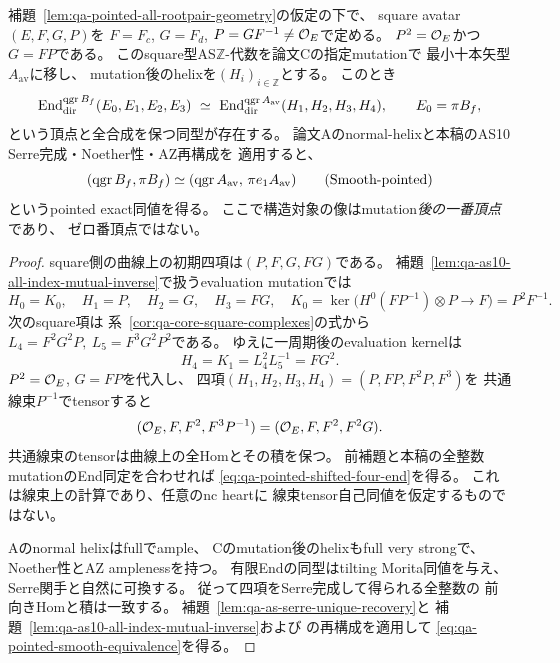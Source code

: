 \begin{theorem}[全noncubic幾何点の位相を合わせたpointed認識]
\label{thm:qa-point-smooth-noncubic-pointed}
\label{thm:qa-point-all-noncubic-pointed}
\label{prop:qa-point-mcm-pointed-finite-end-reduction}
補題~\ref{lem:qa-pointed-all-rootpair-geometry}の仮定の下で、
square avatar $(E,F,G,P)$を
$F=F_c$, $G=F_d$, $P=GF^{-1}\ne\mathcal O_E$で定める。
$P^2=\mathcal O_E$かつ$G=FP$である。
このsquare型AS$\mathbb Z$-代数を論文Cの指定mutationで
最小十本矢型$A_{\mathrm{av}}$に移し、
mutation後のhelixを$(H_i)_{i\in\mathbb Z}$とする。
このとき
\begin{equation}
 \operatorname{End}_{\mathrm{dir}}^{\operatorname{qgr} B_f}(E_0,E_1,E_2,E_3)
 \ \simeq\
 \operatorname{End}_{\mathrm{dir}}^{\operatorname{qgr} A_{\mathrm{av}}}(H_1,H_2,H_3,H_4),
\qquad E_0=\pi B_f,
\label{eq:qa-pointed-shifted-four-end}
\end{equation}
という頂点と全合成を保つ同型が存在する。
論文Aのnormal-helixと本稿のAS10 Serre完成・Noether性・AZ再構成を
適用すると、
\begin{equation}
(\operatorname{qgr} B_f,\pi B_f)\simeq
(\operatorname{qgr} A_{\mathrm{av}},\,\pi e_1A_{\mathrm{av}})
\tag{Smooth-pointed}\label{eq:qa-pointed-smooth-equivalence}
\end{equation}
というpointed exact同値を得る。
ここで構造対象の像はmutation\emph{後の一番頂点}であり、
ゼロ番頂点ではない。
\end{theorem}
\begin{proof}
square側の曲線上の初期四項は$(P,F,G,FG)$である。
補題~\ref{lem:qa-as10-all-index-mutual-inverse}で扱うevaluation mutationでは
\[
 H_0=K_0,\quad H_1=P,\quad H_2=G,\quad H_3=FG,
\quad
 K_0=\ker\bigl(H^0(FP^{-1})\otimes P\to F\bigr)
      =P^2F^{-1}.
\]
次のsquare項は
系~\ref{cor:qa-core-square-complexes}の式から
$L_4=F^2G^2P,\ L_5=F^3G^2P^2$である。
ゆえに一周期後のevaluation kernelは
\[
 H_4=K_1=L_4^2L_5^{-1}=FG^2.
\]
$P^2=\mathcal O_E$, $G=FP$を代入し、
四項$(H_1,H_2,H_3,H_4)=(P,FP,F^2P,F^3)$を
共通線束$P^{-1}$でtensorすると
\[
(\mathcal O_E,F,F^2,F^3P^{-1})
   =(\mathcal O_E,F,F^2,F^2G).
\]
共通線束のtensorは曲線上の全Homとその積を保つ。
前補題と本稿の全整数mutationのEnd同定を合わせれば
\eqref{eq:qa-pointed-shifted-four-end}を得る。
これは線束上の計算であり、任意のnc heartに
線束tensor自己同値を仮定するものではない。

Aのnormal helixはfullでample、
Cのmutation後のhelixもfull very strongで、
Noether性とAZ amplenessを持つ。
有限Endの同型はtilting Morita同値を与え、
Serre関手と自然に可換する。
従って四項をSerre完成して得られる全整数の
前向きHomと積は一致する。
補題~\ref{lem:qa-as-serre-unique-recovery}と
補題~\ref{lem:qa-as10-all-index-mutual-inverse}および
\cite[\texttt{thm:normal-helix}]{QuadricIntrinsic2026}
の再構成を適用して
\eqref{eq:qa-pointed-smooth-equivalence}を得る。
\end{proof}

